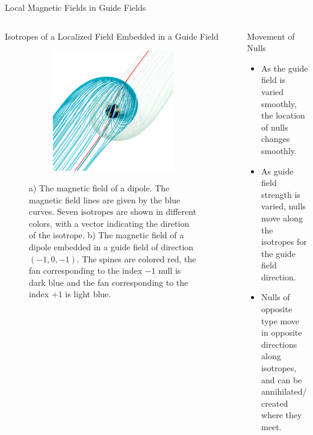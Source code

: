 \documentclass[final]{beamer}
\newlength{\sepwid}
\newlength{\onecolwid}
\newlength{\twocolwid}
\begin{document}
\begin{frame}[t]
\begin{columns}[t]
\begin{column}{\twocolwid}
\begin{block}{\huge{Local Magnetic Fields in Guide Fields}}
\begin{columns}[t,totalwidth=\twocolwid]
\begin{column}{\onecolwid}
\begin{block}{Isotropes of a Localized Field Embedded in a Guide Field}
\begin{figure}
\begin{subfigure}[b]{.45\textwidth}
      \includegraphics[width=\textwidth]{fig/separatrix_dipole.png}
      \caption{}
    \end{subfigure}
    \caption{
      a) The magnetic field of a dipole.
      The magnetic field lines are given by the blue curves.
      Seven isotropes are shown in different colors, with a vector indicating the diretion of the
      isotrope. b) The magnetic field of a dipole embedded in a guide field of direction $(-1,0,-1)$. 
      The spines are colored red, the fan corresponding to the
      index $-1$ null is dark blue and the fan corresponding to the
      index $+1$ is light blue.
    }
  \end{figure}
\end{block}
\end{column}
\begin{column}{\sepwid}\end{column} %
\begin{column}{\onecolwid}
\begin{block}{Movement of Nulls}
  \begin{itemize}
    \item As the guide field is varied smoothly, the location of nulls changes smoothly.
    \item As guide field strength is varied, nulls move along the isotropes for the guide field direction.
    \item Nulls of opposite type move in opposite directions along isotropes,
      and can be annihilated/created where they meet.
  \end{itemize}
\end{block}


\end{column}
\end{columns}
\end{block}
\end{column}
\end{columns}
\end{frame}
\end{document}
